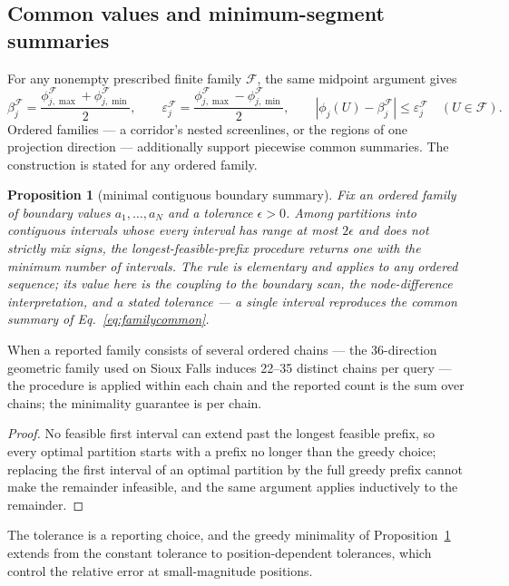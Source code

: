\documentclass[a4paper,fleqn]{cas-sc}
\newtheorem{proposition}[theorem]{Proposition}
\begin{document}
\subsection{Common values and minimum-segment summaries}\label{sec:segments}
For any nonempty prescribed finite family $\mathcal F$, the same midpoint argument gives
\begin{equation}
\beta_j^{\mathcal F}=\frac{\phi_{j,\max}^{\mathcal F}+\phi_{j,\min}^{\mathcal F}}2,
\qquad \varepsilon_j^{\mathcal F}=\frac{\phi_{j,\max}^{\mathcal F}-\phi_{j,\min}^{\mathcal F}}2,
\qquad |\phi_j(U)-\beta_j^{\mathcal F}|\le\varepsilon_j^{\mathcal F}\quad(U\in\mathcal F).
\label{eq:familycommon}
\end{equation}
Ordered families --- a corridor's nested screenlines, or the regions of
one projection direction --- additionally support piecewise common
summaries. The construction is stated for any ordered family.
\begin{proposition}[minimal contiguous boundary summary]\label{prop:segmented}
Fix an ordered family of boundary values $a_1,\ldots,a_N$ and a
tolerance $\epsilon>0$. Among partitions into contiguous intervals
whose every interval has range at most $2\epsilon$ and does not
strictly mix signs, the longest-feasible-prefix procedure returns one
with the minimum number of intervals. The rule is elementary and
applies to any ordered sequence; its value here is the coupling to the
boundary scan, the node-difference interpretation, and a stated
tolerance --- a single interval reproduces the common summary of
Eq.~\eqref{eq:familycommon}.
\end{proposition}
When a reported family consists of several ordered chains --- the
36-direction geometric family used on Sioux Falls induces 22--35
distinct chains per query --- the procedure is applied within each
chain and the reported count is the sum over chains; the minimality
guarantee is per chain.
\begin{proof}
No feasible first interval can extend past the longest feasible prefix,
so every optimal partition starts with a prefix no longer than the
greedy choice; replacing the first interval of an optimal partition by
the full greedy prefix cannot make the remainder infeasible, and the
same argument applies inductively to the remainder.
\end{proof}
The tolerance is a reporting choice, and the greedy minimality of
Proposition~\ref{prop:segmented} extends from the constant tolerance
to position-dependent tolerances, which control the relative error at
small-magnitude positions.
\end{document}
